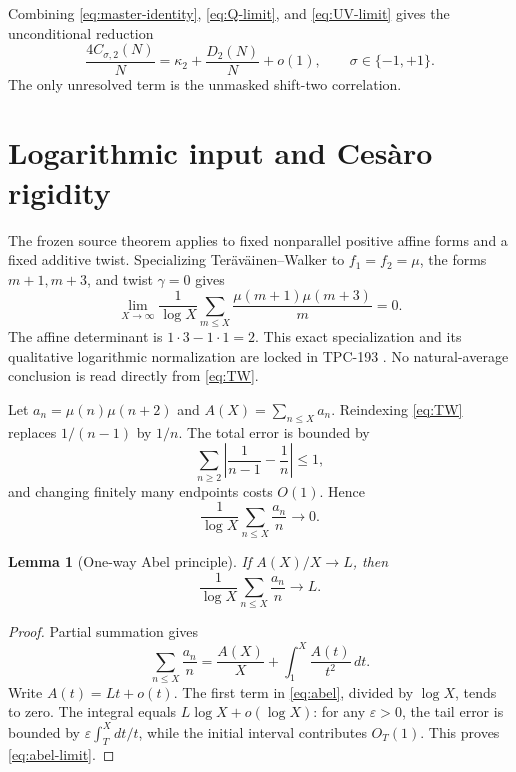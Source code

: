 \documentclass[11pt]{article}
\newtheorem{lemma}[theorem]{Lemma}
\theoremstyle{definition}
\theoremstyle{remark}
\newcommand{\Mob}{\mu}
\begin{document}
Combining \eqref{eq:master-identity}, \eqref{eq:Q-limit}, and
\eqref{eq:UV-limit} gives the unconditional reduction
\begin{equation}
 \frac{4C_{\sigma,2}(N)}N
 =\kappa_2+\frac{D_2(N)}N+o(1),
 \qquad \sigma\in\{-1,+1\}.
 \label{eq:reduction}
\end{equation}
The only unresolved term is the unmasked shift-two correlation.

\section{Logarithmic input and Ces\`aro rigidity}

The frozen source theorem applies to fixed nonparallel positive affine forms
and a fixed additive twist.  Specializing Ter\"av\"ainen--Walker to
$f_1=f_2=\Mob$, the forms $m+1,m+3$, and twist $\gamma=0$ gives
\begin{equation}
 \lim_{X\to\infty}\frac1{\log X}
 \sum_{m\le X}\frac{\Mob(m+1)\Mob(m+3)}m=0.
 \label{eq:TW}
\end{equation}
The affine determinant is $1\cdot3-1\cdot1=2$.  This exact specialization
and its qualitative logarithmic normalization are locked in TPC-193
\cite{TeravainenWalker2025,TPC193}.  No natural-average conclusion is read
directly from \eqref{eq:TW}.

Let $a_n=\Mob(n)\Mob(n+2)$ and $A(X)=\sum_{n\le X}a_n$.  Reindexing
\eqref{eq:TW} replaces $1/(n-1)$ by $1/n$.  The total error is bounded by
\[
 \sum_{n\ge2}\left|\frac1{n-1}-\frac1n\right|\le1,
\]
and changing finitely many endpoints costs $O(1)$.  Hence
\begin{equation}
 \frac1{\log X}\sum_{n\le X}\frac{a_n}{n}\longrightarrow0.
 \label{eq:log-D}
\end{equation}

\begin{lemma}[One-way Abel principle]
If $A(X)/X\to L$, then
\begin{equation}
             \frac1{\log X}\sum_{n\le X}\frac{a_n}{n}\longrightarrow L.
 \label{eq:abel-limit}
\end{equation}
\end{lemma}

\begin{proof}
Partial summation gives
\begin{equation}
 \sum_{n\le X}\frac{a_n}{n}
 =\frac{A(X)}X+\int_1^X\frac{A(t)}{t^2}\,dt.
 \label{eq:abel}
\end{equation}
Write $A(t)=Lt+o(t)$.  The first term in \eqref{eq:abel}, divided by
$\log X$, tends to zero.  The integral equals
$L\log X+o(\log X)$: for any $\varepsilon>0$, the tail error is bounded by
$\varepsilon\int_T^Xdt/t$, while the initial interval contributes
$O_T(1)$.  This proves \eqref{eq:abel-limit}.
\end{proof}
\end{document}
